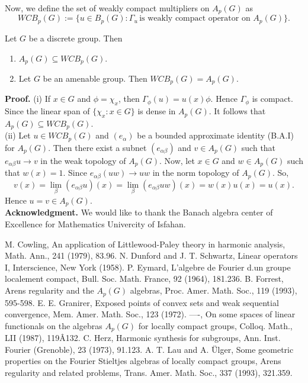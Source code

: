 Now, we define the set of weakly compact multipliers on $A_p(G)$ as
$$WCB_p(G) := \{u\in B_p(G): \Gamma_u\,  \text{is weakly compact operator on $A_p(G)$}\}.$$
\begin{theorem}
Let $G$ be a discrete group. Then
\begin{enumerate}[label=({\roman*})]
\item $A_p(G)\subseteq  WCB_p(G)$.
\item Let $G$ be an amenable group. Then $WCB_p(G)=A_p(G)$.
\end{enumerate}
\end{theorem}
{\bf Proof.}
(i) If $x\in G$ and $\phi=\chi_x$, then $\Gamma_{\phi}(u)= u(x)\phi$. Hence $\Gamma_{\phi}$ is compact. Since the linear span of $\{\chi_x : x\in G\}$ is dense in $A_p(G)$. It follows that $A_p(G)\subseteq WCB_p(G)$. \\
(ii) Let $u\in WCB_p(G)$ and $(e_{\alpha})$ be a bounded approximate identity (B.A.I) for $A_p(G)$. Then there exist a subnet $(e_{\alpha\beta})$ and $v\in A_p(G)$ such that $e_{\alpha\beta}u\longrightarrow v$ in the weak topology of $A_p(G)$. Now, let $x\in G$ and $w\in A_p(G)$ such that $w(x) = 1$. Since $e_{\alpha\beta}(uw)\longrightarrow uw$ in the norm topology of $A_p(G)$. So,
$$v(x) = \lim_{\beta}(e_{\alpha\beta} u)(x) = \lim_{\beta}(e_{\alpha\beta} uw)(x) = w(x)u(x) = u(x).$$
Hence $u = v\in A_p(G)$. \\

{\bf Acknowledgment.} We would like to thank the Banach algebra center of Excellence for Mathematics Univercity of Isfahan.


\begin{thebibliography}{5}
M. Cowling, An application of Littlewood-Paley theory in harmonic analysis, Math. Ann., 241
(1979), 83.96.
N. Dunford and J. T. Schwartz, Linear operators I, Interscience, New York (1958).
P. Eymard, L'algebre de Fourier d.un groupe localement compact, Bull. Soc. Math. France, 92
(1964), 181.236.
B. Forrest, Arens regularity and the $A_p(G)$ algebras, Proc. Amer. Math. Soc., 119 (1993),
595-598.
E. E. Granirer, Exposed points of convex sets and weak sequential convergence, Mem. Amer.
Math. Soc., 123 (1972).
----, On some spaces of linear functionals on the algebras $A_p(G)$ for locally compact groups,
Colloq. Math., LII (1987), 119Â132.
C. Herz, Harmonic synthesis for subgroups, Ann. Inst. Fourier (Grenoble), 23 (1973), 91.123.
A. T. Lau and A. \"Ulger, Some geometric properties on the Fourier Stieltjes algebras of locally
compact groups, Arens regularity and related problems, Trans. Amer. Math. Soc., 337 (1993),
321.359.
\end{thebibliography}

{} 

{}



